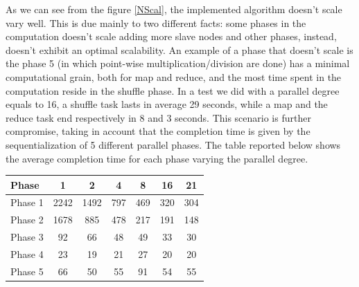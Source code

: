 As we can see from the figure \ref{NScal}, the implemented algorithm doesn't scale vary well. This is due mainly to two different facts: some phases in the computation doesn't scale adding more slave nodes and other phases, instead, doesn't exhibit an optimal scalability. An example of a phase that doesn't scale is the phase 5 (in which point-wise multiplication/division are done) has a minimal computational grain, both for map and reduce, and the most time spent in the computation reside in the shuffle phase. In a test we did with a parallel degree equals to 16, a shuffle task lasts in average 29 seconds, while a map and the reduce task end respectively in 8 and 3 seconds. This scenario is further compromise, taking in account that the completion time is given by the sequentialization of 5 different parallel phases. %
The table reported below shows the average completion time for each phase varying the parallel degree.

\begin{center}
\begin{tabular}{ | l || c | c | c | c |  c | c | }
  \hline      
  Phase & 1 & 2 & 4 & 8 &16 & 21 \\
  \hline      
  Phase 1 & 2242 & 1492 & 797 & 469 & 320 & 304\\
  Phase 2 & 1678 & 885 & 478 & 217 & 191 & 148\\
  Phase 3 & 92 & 66 & 48 & 49 & 33 & 30\\ 
  Phase 4 & 23 & 19 & 21 & 27 & 20 & 20\\
  Phase 5 & 66 & 50 & 55 & 91 & 54 & 55\\
  \hline  
\end{tabular} 
\end{center}





